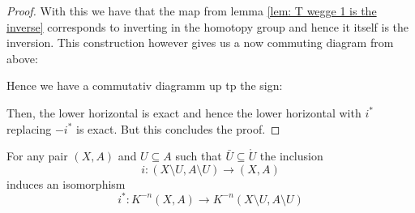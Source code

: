 \begin{proof}
	With this we have that the map from lemma \ref{lem: T wegge 1 is the inverse} corresponds to inverting in the homotopy group and hence it itself is the inversion. This construction however gives us a now commuting diagram from above: 
	\begin{center}
	\end{center} Hence we have a commutativ diagramm up tp the sign: 
	\begin{center}
	\end{center} Then, the lower horizontal is exact and hence the lower horizontal with $i^*$ replacing $-i^*$ is exact. But this concludes the proof.
\end{proof}
\begin{theorem}[Excision]
	For any pair $(X,A)$ and $U\subseteq A$ such that $\bar{U}\subseteq \mathring{U}$ the inclusion 
	\begin{equation*}
		i: (X\setminus U,A\setminus U) \to (X,A)
	\end{equation*} induces an isomorphism
	\begin{equation*}
		i^*:  K^{-n}(X,A)\to K^{-n}(X\setminus U,A\setminus U)
	\end{equation*}
\end{theorem}

